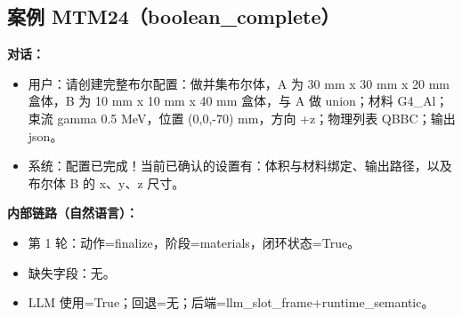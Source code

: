 \documentclass[11pt]{ctexart}
\begin{document}
\subsection{案例 MTM24（boolean\_complete）}
\textbf{对话：}
\begin{itemize}
\item 用户：请创建完整布尔配置：做并集布尔体，A 为 30 mm x 30 mm x 20 mm 盒体，B 为 10 mm x 10 mm x 40 mm 盒体，与 A 做 union；材料 G4\_Al；束流 gamma 0.5 MeV，位置 (0,0,-70) mm，方向 +z；物理列表 QBBC；输出 json。
\item 系统：配置已完成！当前已确认的设置有：体积与材料绑定、输出路径，以及布尔体 B 的 x、y、z 尺寸。
\end{itemize}
\textbf{内部链路（自然语言）：}
\begin{itemize}
\item 第 1 轮：动作=finalize，阶段=materials，闭环状态=True。
\item 缺失字段：无。
\item LLM 使用=True；回退=无；后端=llm\_slot\_frame+runtime\_semantic。
\end{itemize}
\end{document}

